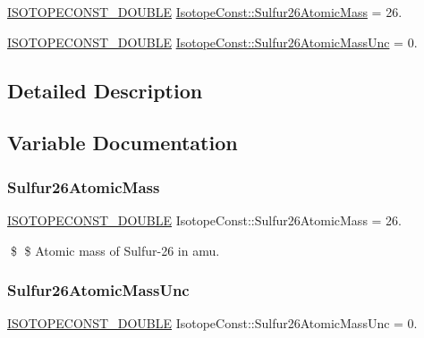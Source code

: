\begin{DoxyCompactItemize}
\item 
\mbox{\hyperlink{group___isotope_const-_macros_ga8f45a7272ce02c0b4c65c44636ed719a}{I\+S\+O\+T\+O\+P\+E\+C\+O\+N\+S\+T\+\_\+\+D\+O\+U\+B\+LE}} \mbox{\hyperlink{group___isotope_const-_sulfur-_s26_ga7a603c008ec7ef6fa0e573aed95b01cc}{Isotope\+Const\+::\+Sulfur26\+Atomic\+Mass}} = 26.
\item 
\mbox{\hyperlink{group___isotope_const-_macros_ga8f45a7272ce02c0b4c65c44636ed719a}{I\+S\+O\+T\+O\+P\+E\+C\+O\+N\+S\+T\+\_\+\+D\+O\+U\+B\+LE}} \mbox{\hyperlink{group___isotope_const-_sulfur-_s26_gabfa995bc7848901174bbe2687ae9dc9a}{Isotope\+Const\+::\+Sulfur26\+Atomic\+Mass\+Unc}} = 0.
\end{DoxyCompactItemize}


\subsection{Detailed Description}


\subsection{Variable Documentation}
\mbox{\label{group___isotope_const-_sulfur-_s26_ga7a603c008ec7ef6fa0e573aed95b01cc}} 
\subsubsection{\texorpdfstring{Sulfur26\+Atomic\+Mass}{Sulfur26AtomicMass}}
{\footnotesize\ttfamily \mbox{\hyperlink{group___isotope_const-_macros_ga8f45a7272ce02c0b4c65c44636ed719a}{I\+S\+O\+T\+O\+P\+E\+C\+O\+N\+S\+T\+\_\+\+D\+O\+U\+B\+LE}} Isotope\+Const\+::\+Sulfur26\+Atomic\+Mass = 26.}

\$ \$ Atomic mass of Sulfur-\/26 in amu. \mbox{\label{group___isotope_const-_sulfur-_s26_gabfa995bc7848901174bbe2687ae9dc9a}} 
\subsubsection{\texorpdfstring{Sulfur26\+Atomic\+Mass\+Unc}{Sulfur26AtomicMassUnc}}
{\footnotesize\ttfamily \mbox{\hyperlink{group___isotope_const-_macros_ga8f45a7272ce02c0b4c65c44636ed719a}{I\+S\+O\+T\+O\+P\+E\+C\+O\+N\+S\+T\+\_\+\+D\+O\+U\+B\+LE}} Isotope\+Const\+::\+Sulfur26\+Atomic\+Mass\+Unc = 0.}

